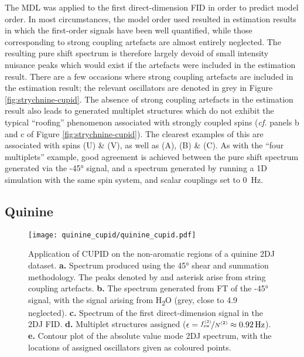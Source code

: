 The \ac{MDL} was applied to the first direct-dimension \ac{FID} in order to
predict model order. In most circumstances, the model order used resulted
in estimation results in which the first-order signals have been well
quantified, while those corresponding to strong coupling artefacts are almost
entirely neglected.
The resulting pure shift spectrum is therefore largely devoid
of small intensity nuisance peaks which would exist if the artefacts were
included in the estimation result. There are a few occasions where strong
coupling artefacts are included in the estimation result; the relevant
oscillators are denoted in grey in Figure \ref{fig:strychnine-cupid}. The
absence of strong coupling artefacts in the estimation result also leads to
generated multiplet structures which do not exhibit the typical ``roofing''
phenomenon associated with strongly coupled spins (\textit{cf.} panels b and c of
Figure \ref{fig:strychnine-cupid}). The clearest examples of this are
associated with spins (U) \& (V), as well as (A), (B) \& (C). As with the
``four multiplets'' example, good agreement is achieved between the pure shift
spectrum generated via the \ang{-45} signal, and a spectrum generated by
running a \ac{1D} simulation with the same spin system, and scalar couplings
set to \qty{0}{\hertz}.

\subsection{Quinine}
\begin{figure}
    \centering
    \texttt{[image: quinine\_cupid/quinine\_cupid.pdf]}
    \caption[
        Application of \acs{CUPID} on the non-aromatic regions of a quinine
        \acs{2DJ} dataset.
    ]{
        Application of \ac{CUPID} on the non-aromatic regions of a quinine
        \ac{2DJ} dataset.
        \textbf{a.} Spectrum produced using the \ang{45} shear and summation
        methodology. The peaks denoted by and asterisk arise from string
        coupling artefacts.
        \textbf{b.} The spectrum generated from \ac{FT} of the \ang{-45}
        signal, with the signal arising from H\textsubscript{2}O (grey, close
        to \qty{4.9}{\partspermillion} neglected).
        \textbf{c.} Spectrum of the first direct-dimension signal in the
        \ac{2DJ} \ac{FID}.
        \textbf{d.} Multiplet structures assigned ($\epsilon =
        \nicefrac{\fswtwo}{\Ntwo} \approx \qty{0.92}{\hertz}$).
        \textbf{e.} Contour plot of the absolute value mode \ac{2DJ} spectrum,
        with the locations of assigned oscillators given as coloured points.
    }
    \label{fig:quinine-cupid}
\end{figure}

